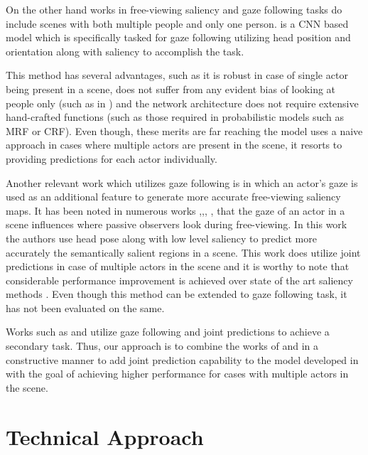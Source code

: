 \documentclass[10pt,twocolumn,letterpaper]{article}
\begin{document}
\vspace{3ex}
 On the other hand works in free-viewing saliency and gaze following tasks do include scenes with both multiple people and only one person. \cite{fathi2012social} is a CNN based model which is specifically tasked for gaze following utilizing head position and orientation along with saliency to accomplish the task.

 This method has several advantages, such as it is robust in case of single actor being present in a scene, does not suffer from any evident bias of looking at people only (such as in \cite{fathi2012social}) and the network architecture does not require extensive hand-crafted functions (such as those required in probabilistic models such as MRF or CRF). Even though, these merits are far reaching the model uses a naive approach in cases where multiple actors are present in the scene, it resorts to providing predictions for each actor individually.

 Another relevant work which utilizes gaze following is \cite{parks2015augmented} in which an actor’s gaze is used as an additional feature to generate more accurate free-viewing saliency maps. It has been noted in numerous works \cite{parks2015augmented},\cite{marin2014detecting},\cite{flom2007gaze}, \cite{emery2000eyes}, \cite{newman2000real} that the gaze of an actor in a scene influences where passive observers look during free-viewing. In this work the authors use head pose \cite{newman2000real} along with low level saliency \cite{garcia2012saliency} to predict more accurately the semantically salient regions in a scene. This work does utilize joint predictions in case of multiple actors in the scene and it is worthy to note that considerable performance improvement is achieved over state of the art saliency methods \cite{garcia2012saliency}. Even though this method can be extended to gaze following task, it has not been evaluated on the same.

 Works such as \cite{fathi2012social} and \cite{parks2015augmented} utilize gaze following and joint predictions to achieve a secondary task. Thus, our approach is to combine the works of \cite{fathi2012social} and \cite{nips15_recasens} in a constructive manner to add joint prediction capability to the model developed in \cite{fathi2012social} with the goal of achieving higher performance for cases with multiple actors in the scene.

\section{Technical Approach}
\end{document}
